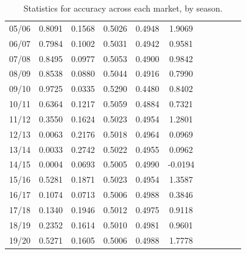 \documentclass[a4paper,10pt]{report}
\begin{document}
\begin{table}[h!]
\begin{center}
\begin{tabular}{c||ccccc||ccccc}
	05/06& 0.8091& 0.1568& 0.5026& 0.4948&  1.9069&&&&&\\
	06/07& 0.7984& 0.1002& 0.5031& 0.4942&  0.9581&&&&&\\
	07/08& 0.8495& 0.0977& 0.5053& 0.4900& 0.9842&&&&&\\
	08/09& 0.8538& 0.0880& 0.5044& 0.4916&  0.7990&&&&&\\
	09/10& 0.9725& 0.0335& 0.5290& 0.4480&  0.8402&&&&&\\
	10/11& 0.6364& 0.1217& 0.5059& 0.4884&  0.7321&&&&&\\
	11/12& 0.3550& 0.1624& 0.5023& 0.4954&  1.2801&&&&&\\
	12/13& 0.0063& 0.2176& 0.5018& 0.4964&  0.0969&&&&&\\
	13/14& 0.0033& 0.2742& 0.5022& 0.4955&  0.0962&&&&&\\
	14/15& 0.0004& 0.0693& 0.5005& 0.4990& -0.0194&&&&&\\
	15/16& 0.5281& 0.1871& 0.5023& 0.4954&  1.3587&&&&&\\
	16/17& 0.1074& 0.0713& 0.5006& 0.4988&  0.3846&&&&&\\
	17/18& 0.1340& 0.1946& 0.5012& 0.4975&  0.9118&&&&&\\
	18/19& 0.2352& 0.1614& 0.5010& 0.4981&  0.9601&&&&&\\
	19/20& 0.5271& 0.1605& 0.5006& 0.4988&  1.7778
\end{tabular}
\end{center}\caption{Statistics for accuracy across each market, by season. \label{tab:accstatsseasons}}
\end{table}
\end{document}
